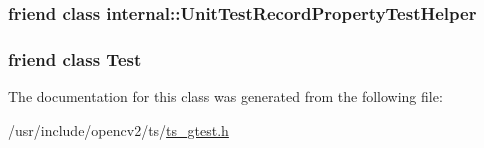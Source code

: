 \hypertarget{classtesting_1_1UnitTest_ae970f89a9f477a349fe5778be85ef42e}{
\subsubsection[{internal\-::\-Unit\-Test\-Record\-Property\-Test\-Helper}]{\setlength{\rightskip}{0pt plus 5cm}friend class internal\-::\-Unit\-Test\-Record\-Property\-Test\-Helper\hspace{0.3cm}{\ttfamily [friend]}}}\label{classtesting_1_1UnitTest_ae970f89a9f477a349fe5778be85ef42e}
\hypertarget{classtesting_1_1UnitTest_a5b78b1c2e1fa07ffed92da365593eaa4}{
\subsubsection[{Test}]{\setlength{\rightskip}{0pt plus 5cm}friend class {\bf Test}\hspace{0.3cm}{\ttfamily [friend]}}}\label{classtesting_1_1UnitTest_a5b78b1c2e1fa07ffed92da365593eaa4}


The documentation for this class was generated from the following file\-:\begin{DoxyCompactItemize}
\item 
/usr/include/opencv2/ts/\hyperlink{ts__gtest_8h}{ts\-\_\-gtest.\-h}\end{DoxyCompactItemize}
